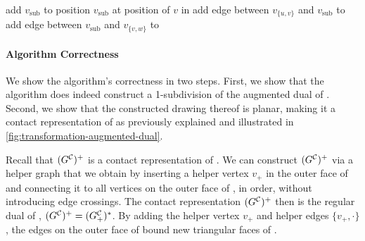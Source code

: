 \begin{algorithm}[H]
{    \label{line:transformation-loop3-start}
    add  $v_\text{sub}$ to \initmap{}\; \label{line:transformation-subdivisionvertex3}
    position $v_\text{sub}$ at position of $v$ in \clustergraph{}\;
    add edge between $v_{\{u,v\}}$ and $v_\text{sub}$ to \initmap{}\; \label{line:transformation-edgetype3-start}
    add edge between $v_\text{sub}$ and $v_{\{v,w\}}$ to \initmap{}\; \label{line:transformation-edgetype3-end}
    \label{line:transformation-loop3-end}
  }
  \BlankLine
  \Return \initmap{}
\end{algorithm}
\vfill



\paragraph{Algorithm Correctness}

We show the algorithm's correctness in two steps.
First, we show that the algorithm does indeed construct a 1-subdivision of the augmented dual of \clustergraph{}.
Second, we show that the constructed drawing thereof is planar, making it a contact representation of \clustergraph{} as previously explained and illustrated in \cref{fig:transformation-augmented-dual}.

Recall that $(G^\mathcal{C}_{})^+$ is a contact representation of \clustergraph{}.
We can construct $(G^\mathcal{C}_{})^+$ via a helper graph \clustergraph{+} that we obtain by inserting a helper vertex $v_+$ in the outer face of \clustergraph{} and connecting it to all vertices on the outer face of \clustergraph{}, in order, without introducing edge crossings.
The contact representation $(G^\mathcal{C}_{})^+$ then is the regular dual of \clustergraph{+}, \ie{} $(G^\mathcal{C}_{})^+ = (G^\mathcal{C}_{+})^*$.
By adding the helper vertex $v_+$ and helper edges $\{v_+,\cdot\}$, the edges on the outer face of \clustergraph{} bound new triangular faces of \clustergraph{+}.

